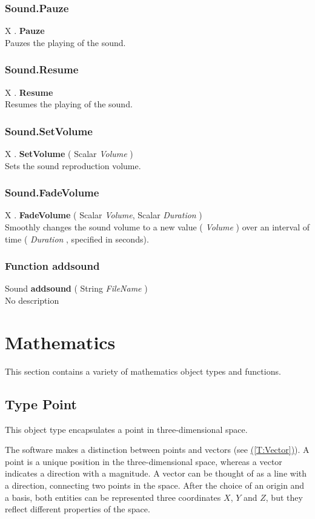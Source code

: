 \documentclass[10pt]{book}
\newcommand{\linkitem}[1]{\hyperref[#1]{\nameref{#1} (\ref{#1})}}
\newcommand{\var}[1]{\textit{#1}}
\begin{document}
\subsubsection{Sound.Pauze \label{F:Sound:Pauze}}
X . \textbf{Pauze} \\
Pauzes the playing of the sound.

\subsubsection{Sound.Resume \label{F:Sound:Resume}}
X . \textbf{Resume} \\
Resumes the playing of the sound.

\subsubsection{Sound.SetVolume \label{F:Sound:SetVolume}}
X . \textbf{SetVolume} ( Scalar \textit{Volume} ) \\
Sets the sound reproduction volume.

\subsubsection{Sound.FadeVolume \label{F:Sound:FadeVolume}}
X . \textbf{FadeVolume} ( Scalar \textit{Volume}, Scalar \textit{Duration} ) \\
Smoothly changes the sound volume to a new value ( \var{Volume} ) over an interval of time ( \var{Duration} , specified in seconds).

\subsubsection{Function addsound \label{F:addsound}}
Sound \textbf{addsound} ( String \textit{FileName} ) \\
No description

\section{Mathematics \label{Mathematics}}
This section contains a variety of mathematics object types and functions.

\subsection{Type Point \label{T:Point}}
This object type encapsulates a point in three-dimensional space.

The software makes a distinction between points and vectors (see \linkitem{T:Vector}). A point is a unique position in the three-dimensional space, whereas a vector indicates a direction with a magnitude. A vector can be thought of as a line with a direction, connecting two points in the space. After the choice of an origin and a basis, both entities can be represented three coordinates $X$, $Y$ and $Z$, but they reflect different properties of the space.
\end{document}
